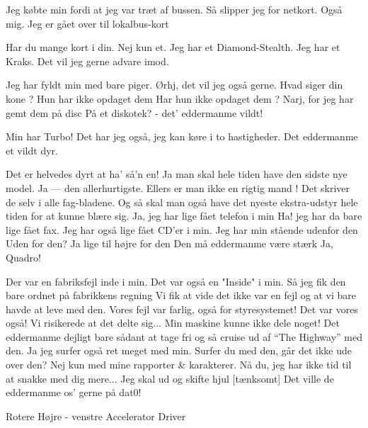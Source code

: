 \documentclass[10pt]{article}
\begin{document}
\begin{sketch}
     Jeg købte min fordi at jeg var træt af bussen. Så slipper jeg 
             for netkort.
     Også mig. Jeg er gået over til lokalbus-kort


     Har du mange kort i din.
     Nej kun et.
     Jeg har et Diamond-Stealth.
     Jeg har et Kraks.
     Det vil jeg gerne advare imod.

     Jeg har fyldt min med bare piger.
     Ørhj, det vil jeg også gerne. Hvad siger din kone ?
     Hun har ikke opdaget dem
     Har hun ikke opdaget dem ?
     Narj, for jeg har gemt dem på disc
     På et diskotek? - det' eddermanme vildt!

     Min har Turbo!
     Det har jeg også, jeg kan køre i to hastigheder.
     Det eddermanme et vildt dyr.

     Det er helvedes dyrt at ha' så'n en!
     Ja man skal hele tiden have den sidste nye model.
     Ja --- den allerhurtigste.
     Ellers er man ikke en rigtig mand !
     Det skriver de selv i alle fag-bladene.
     Og så skal man også have det nyeste ekstra-udstyr hele
        tiden for at kunne blære sig.
     Ja, jeg har lige fået telefon i min
     Ha! jeg har da bare lige fået fax.
     Jeg har også lige fået CD'er i min.
     Jeg har min stående udenfor den
     Uden for den?
     Ja lige til højre for den
     Den må eddermanme være stærk
     Ja, Quadro!

     Der var en fabriksfejl inde i min.
     Det var også en "Inside" i min.
     Så jeg fik den bare ordnet på fabrikkens regning
     Vi fik at vide det ikke var en fejl og at vi bare havde
        at leve med den.
     Vores fejl var farlig, også for styresystemet!
     Det var vores også!
     Vi risikerede at det delte sig...
     Min maskine kunne ikke dele noget!
     Det eddermanme dejligt bare sådant at tage fri og så
             cruise ud af ``The Highway'' med den.
     Ja jeg surfer også ret meget med min.
     Surfer du med den, går det ikke ude over den?
     Nej kun med mine rapporter \& karakterer.
     Nå du, jeg har ikke tid til at snakke med dig mere... 
             Jeg skal ud og skifte hjul
[tænksomt] Det ville de eddermanme os' gerne på dat0!

\vspace{2cm}

Rotere  Højre - venstre
Accelerator 
Driver

\end{sketch}
\end{document}
